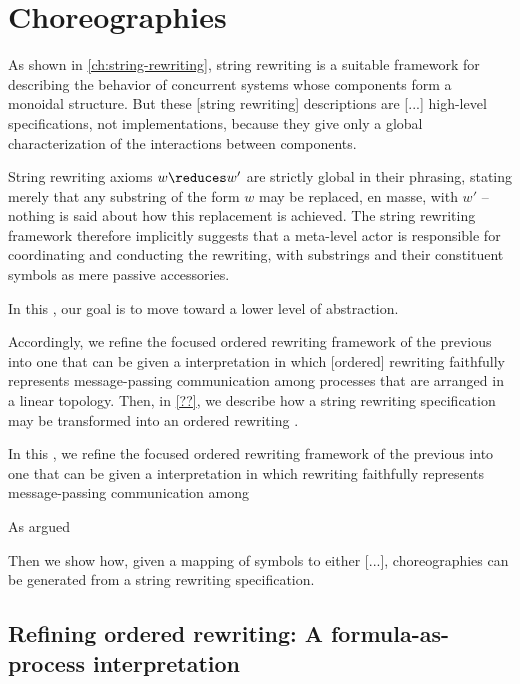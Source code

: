 \chapter{Choreographies}\label{ch:choreographies}

As shown in \cref{ch:string-rewriting}, string rewriting is a suitable framework for describing the behavior of concurrent systems whose components form a monoidal structure.
But these [string rewriting] descriptions are [...] high-level specifications, not implementations, because they give only a global characterization of the interactions between components.

String rewriting axioms $w \reduces w'$ are strictly global in their phrasing, stating merely that any substring of the form $w$ may be replaced, en masse, with $w'$ -- nothing is said about how this replacement is achieved.
The string rewriting framework therefore implicitly suggests that a meta-level actor is responsible for coordinating and conducting the rewriting, with substrings and their constituent symbols as mere passive accessories.

In this , our goal is to move toward a lower level of abstraction.

Accordingly, we refine the focused ordered rewriting framework of the previous  into one that can be given a  interpretation in which [ordered] rewriting faithfully represents message-passing communication among processes that are arranged in a linear topology.
Then, in \cref{??}, we describe how a string rewriting specification may be transformed into an ordered rewriting .

In this , we refine the focused ordered rewriting framework of the previous  into one that can be given a  interpretation in which rewriting faithfully represents message-passing communication among 

As argued 

Then we show how, given a mapping of symbols to either [...], choreographies can be generated from a string rewriting specification.

\section{Refining ordered rewriting: A formula-as-process interpretation}

